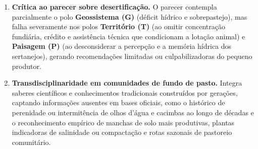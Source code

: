 \begin{boxGabarito}
\begin{enumerate}[leftmargin=1.8em, itemsep=4pt, start=6]
  \item \textbf{Crítica ao parecer sobre desertificação.} O parecer contempla parcialmente o polo \textbf{Geossistema (G)} (déficit hídrico e sobrepastejo), mas falha severamente nos polos \textbf{Território (T)} (ao omitir concentração fundiária, crédito e assistência técnica que condicionam a lotação animal) e \textbf{Paisagem (P)} (ao desconsiderar a percepção e a memória hídrica dos sertanejos), gerando recomendações limitadas ou culpabilizadoras do pequeno produtor.
  \item \textbf{Transdisciplinaridade em comunidades de fundo de pasto.} Integra saberes científicos e conhecimentos tradicionais construídos por gerações, captando informações ausentes em bases oficiais, como o histórico de perenidade ou intermitência de olhos d'água e cacimbas ao longo de décadas e o reconhecimento empírico de manchas de solo mais produtivas, plantas indicadoras de salinidade ou compactação e rotas sazonais de pastoreio comunitário.
\end{enumerate}
\end{boxGabarito}


